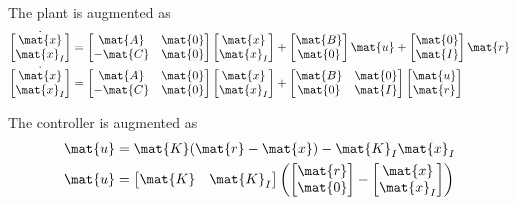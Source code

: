 The \gls{plant} is augmented as
\begin{align*}
  \dot{\begin{bmatrix}
    \mat{x} \\
    \mat{x}_I
  \end{bmatrix}} &=
  \begin{bmatrix}
    \mat{A} & \mat{0} \\
    -\mat{C} & \mat{0}
  \end{bmatrix}
  \begin{bmatrix}
    \mat{x} \\
    \mat{x}_I
  \end{bmatrix} +
  \begin{bmatrix}
    \mat{B} \\
    \mat{0}
  \end{bmatrix}
  \mat{u} +
  \begin{bmatrix}
    \mat{0} \\
    \mat{I}
  \end{bmatrix}
  \mat{r} \\
  \dot{\begin{bmatrix}
    \mat{x} \\
    \mat{x}_I
  \end{bmatrix}} &=
  \begin{bmatrix}
    \mat{A} & \mat{0} \\
    -\mat{C} & \mat{0}
  \end{bmatrix}
  \begin{bmatrix}
    \mat{x} \\
    \mat{x}_I
  \end{bmatrix} +
  \begin{bmatrix}
    \mat{B} & \mat{0} \\
    \mat{0} & \mat{I}
  \end{bmatrix}
  \begin{bmatrix}
    \mat{u} \\
    \mat{r}
  \end{bmatrix}
\end{align*}

The controller is augmented as
\begin{align*}
  \mat{u} &= \mat{K} (\mat{r} - \mat{x}) - \mat{K}_I\mat{x}_I \\
  \mat{u} &=
  \begin{bmatrix}
    \mat{K} & \mat{K}_I
  \end{bmatrix}
  \left(\begin{bmatrix}
    \mat{r} \\
    \mat{0}
  \end{bmatrix} -
  \begin{bmatrix}
    \mat{x} \\
    \mat{x}_I
  \end{bmatrix}\right)
\end{align*}

